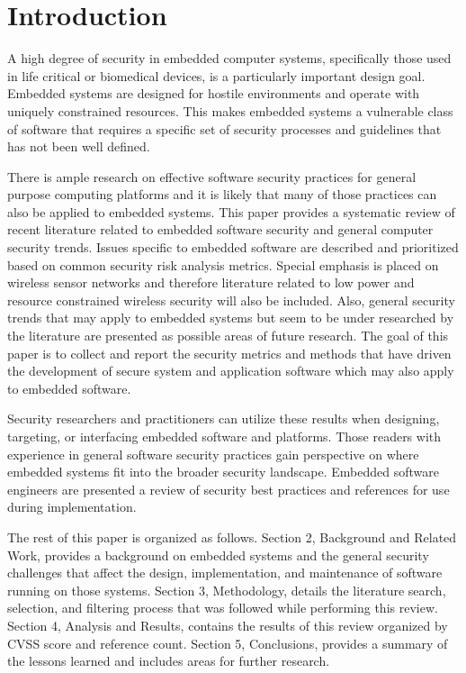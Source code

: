 \documentclass[final,conference,11pt]{IEEEtran}
\begin{document}
\section{Introduction} 

A high degree of security in embedded computer systems, specifically those used in life critical or biomedical devices, is a particularly important design goal.  Embedded systems are designed for hostile environments and operate with uniquely constrained resources. This makes embedded systems a vulnerable class of software that requires a specific set of security processes and guidelines that has not been well defined.   

There is ample research on effective software security practices for general purpose computing platforms and it is likely that many of those practices can also be applied to embedded systems. This paper provides a systematic review of recent literature related to embedded software security and general computer security trends. Issues specific to embedded software are described and prioritized based on common security risk analysis metrics.  Special emphasis is placed on wireless sensor networks and therefore literature related to low power and resource constrained wireless security will also be included.  Also, general security trends that may apply to embedded systems but seem to be under researched by the literature are presented as possible areas of future research.  The goal of this paper is to collect and report the security metrics and methods that have driven the development of secure system and application software which may also apply to embedded software.

Security researchers and practitioners can utilize these results when designing, targeting, or interfacing embedded software and platforms.  Those readers with experience in general software security practices gain perspective on where embedded systems fit into the broader security landscape.  Embedded software engineers are presented a review of security best practices and references for use during implementation.

The rest of this paper is organized as follows. Section 2, Background and Related Work, provides a background on embedded systems and the general security challenges that affect the design, implementation, and maintenance of software running on those systems. Section 3, Methodology, details the literature search, selection, and filtering process that was followed while performing this review. Section 4, Analysis and Results, contains the results of this review organized by CVSS score and reference count. Section 5, Conclusions, provides a summary of the lessons learned and includes areas for further research.
\end{document}
